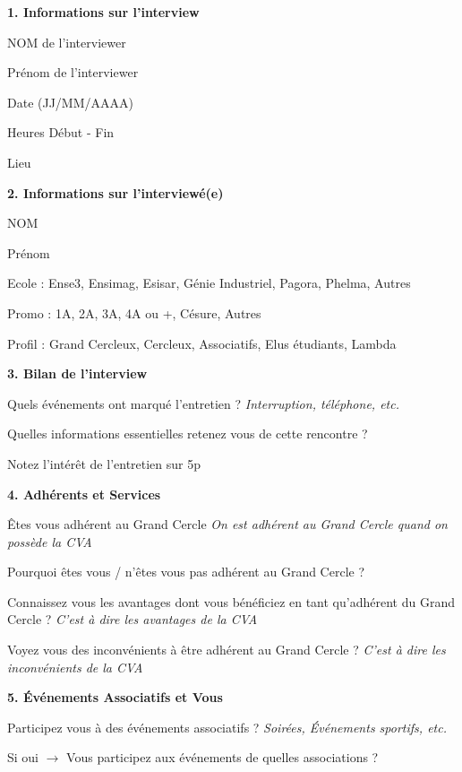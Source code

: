 \documentclass[a4paper, 11px]{article}
\begin{document}
 \textbf {\large 1. Informations sur l'interview}

	NOM de l'interviewer
	
	Prénom de l'interviewer
	
	Date (JJ/MM/AAAA)
	
	Heures Début - Fin
	
	Lieu

\vspace{.3cm}

 \textbf {\large 2. Informations sur l'interviewé(e)}

	NOM
	
	Prénom
	
	Ecole : 
	 Ense3,
	 Ensimag,
	 Esisar,
	 Génie Industriel,
	 Pagora,
	 Phelma,
	 Autres
	
	Promo :
	 1A,
	 2A,
	 3A,
	 4A ou +,
	 Césure,
	 Autres
	
	Profil : 
	 Grand Cercleux,
	 Cercleux,
	 Associatifs,
	 Elus étudiants,
	 Lambda

\vspace{.3cm}

 \textbf {\large 3. Bilan de l'interview}

Quels événements ont marqué l'entretien ?
\textit{Interruption, téléphone, etc.}

Quelles informations essentielles retenez vous de cette rencontre ?

Notez l'intérêt de l'entretien sur 5p


\vspace{.3cm}

 \textbf {\large 4. Adhérents et Services}

Êtes vous adhérent au Grand Cercle
\textit{On est adhérent au Grand Cercle quand on possède la CVA}

Pourquoi êtes vous / n'êtes vous pas adhérent au Grand Cercle ?

Connaissez vous les avantages dont vous bénéficiez en tant qu'adhérent du Grand Cercle ?
\textit{C'est à dire les avantages de la CVA}

Voyez vous des inconvénients à être adhérent au Grand Cercle ?
\textit{C'est à dire les inconvénients de la CVA}


\vspace{.2cm}
 \textbf {\large 5. Événements Associatifs et Vous}

Participez vous à des événements associatifs ?
\textit{Soirées, Événements sportifs, etc.}

Si oui $\rightarrow$ Vous participez aux événements de quelles associations ?
\end{document}
